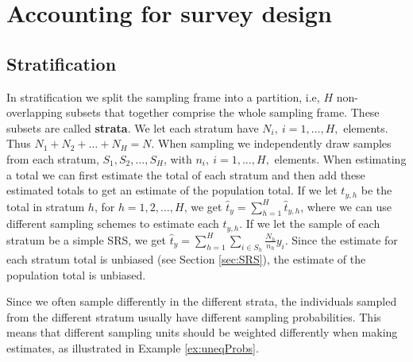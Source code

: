\documentclass{article}
\begin{document}
\section{Accounting for survey design} \label{sec:surveyDesign}

\subsection{Stratification} \label{sec:strat}

In stratification we split the sampling frame into a partition, i.e, \(H\)
non-overlapping
subsets that together comprise the whole sampling frame. These
subsets are called \textbf{strata}. We let each stratum have \(N_i,\ i = 1, \dots
, H,\) elements. Thus \(N_1 + N_2 + \dots + N_H = N\). When sampling we
independently draw samples from each stratum, \(S_1, S_2, \dots, S_H\), with \(n_i,\ i = 1, \dots
, H,\) elements. When
estimating a total we can first estimate the total of each stratum and
then add these estimated totals to get an estimate of the population total.
If we let \(t_{y,h}\) be the total in stratum \(h\), for \(h = 1, 2, \dots, H\), we get \(\hat{t}_y =
\sum_{h = 1}^H \hat{t}_{y, h} \), where we can use different sampling schemes to
estimate each \(t_{y, h}\).
If we let the sample of each stratum be a simple SRS, we get \( \hat{t}_y =
\sum_{h = 1}^H\sum_{i \in S_h}\frac{N_h}{n_h}y_i\).
Since the estimate for each
stratum total is unbiased (see Section \ref{sec:SRS}), the estimate of the population
total is unbiased.

Since we often sample differently in the different strata,
the individuals sampled from the different stratum usually have
different sampling probabilities. This means that different sampling units
should be weighted differently when making estimates, as illustrated in Example \ref{ex:uneqProbs}.
\end{document}
